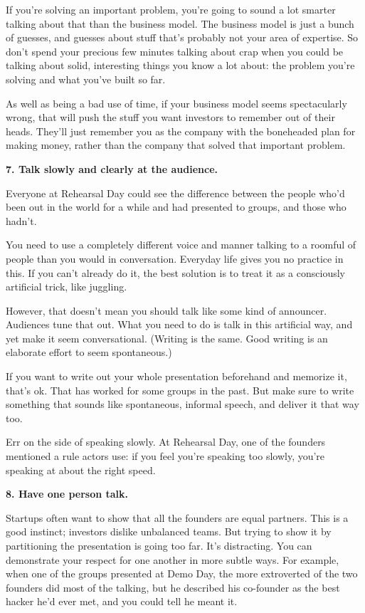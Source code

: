\documentclass[12pt]{book}
\begin{document}
If you're solving an important problem, you're going to sound a lot
smarter talking about that than the business model. The business model
is just a bunch of guesses, and guesses about stuff that's probably not
your area of expertise. So don't spend your precious few minutes talking
about crap when you could be talking about solid, interesting things you
know a lot about: the problem you're solving and what you've built so
far.

As well as being a bad use of time, if your business model seems
spectacularly wrong, that will push the stuff you want investors to
remember out of their heads. They'll just remember you as the company
with the boneheaded plan for making money, rather than the company that
solved that important problem.

\textbf{7. Talk slowly and clearly at the audience.}

Everyone at Rehearsal Day could see the difference between the people
who'd been out in the world for a while and had presented to groups, and
those who hadn't.

You need to use a completely different voice and manner talking to a
roomful of people than you would in conversation. Everyday life gives
you no practice in this. If you can't already do it, the best solution
is to treat it as a consciously artificial trick, like juggling.

However, that doesn't mean you should talk like some kind of announcer.
Audiences tune that out. What you need to do is talk in this artificial
way, and yet make it seem conversational. (Writing is the same. Good
writing is an elaborate effort to seem spontaneous.)

If you want to write out your whole presentation beforehand and memorize
it, that's ok. That has worked for some groups in the past. But make
sure to write something that sounds like spontaneous, informal speech,
and deliver it that way too.

Err on the side of speaking slowly. At Rehearsal Day, one of the
founders mentioned a rule actors use: if you feel you're speaking too
slowly, you're speaking at about the right speed.

\textbf{8. Have one person talk.}

Startups often want to show that all the founders are equal partners.
This is a good instinct; investors dislike unbalanced teams. But trying
to show it by partitioning the presentation is going too far. It's
distracting. You can demonstrate your respect for one another in more
subtle ways. For example, when one of the groups presented at Demo Day,
the more extroverted of the two founders did most of the talking, but he
described his co-founder as the best hacker he'd ever met, and you could
tell he meant it.
\end{document}
